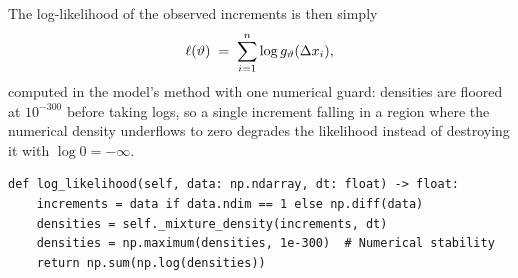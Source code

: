 The log-likelihood of the observed increments is then simply
\begin{equation}
  \ell(\vartheta)
  \;=\;
  \sum_{i=1}^{n} \log g_{\vartheta}(\Delta x_i),
  \label{eq:loglik}
\end{equation}
computed in the model's  method with one numerical
guard: densities are floored at $10^{-300}$ before taking logs, so a
single increment falling in a region where the numerical density
underflows to zero degrades the likelihood instead of destroying it with
$\log 0 = -\infty$.

\begin{lstlisting}[caption={Log-likelihood \eqref{eq:loglik} with underflow guard.}]
def log_likelihood(self, data: np.ndarray, dt: float) -> float:
    increments = data if data.ndim == 1 else np.diff(data)
    densities = self._mixture_density(increments, dt)
    densities = np.maximum(densities, 1e-300)  # Numerical stability
    return np.sum(np.log(densities))
\end{lstlisting}
